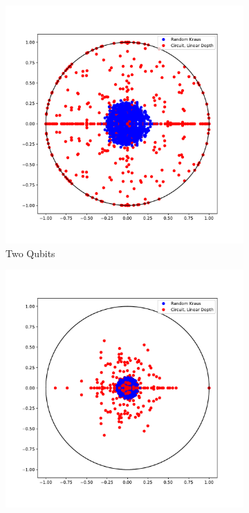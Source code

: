 \documentclass{article}
\begin{document}
\begin{figure}[htbp]
\begin{subfigure}[t]{0.3\textwidth}
    \includegraphics[width=\linewidth]{../figures/twoQubit_linearDepth}
\caption{Two Qubits}
\label{fig:figure14_4}
\end{subfigure}\hfill
\begin{subfigure}[t]{0.3\textwidth}
    \includegraphics[width=\linewidth]{../figures/threeQubit_linearDepth}

\end{subfigure}
\end{figure}
\end{document}

